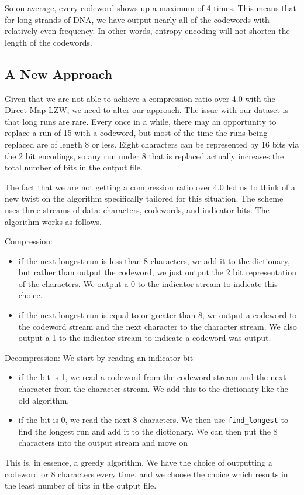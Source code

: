 \documentclass[12pt,twoside]{reedthesis}
\providecommand{\tightlist}{%
  \setlength{\itemsep}{0pt}\setlength{\parskip}{0pt}}
\begin{document}
So on average, every codeword shows up a maximum of 4 times. This means that for long strands of DNA, we have output nearly all of the codewords with relatively even frequency. In other words, entropy encoding will not shorten the length of the codewords.

\hypertarget{a-new-approach}{%
\subsection{A New Approach}\label{a-new-approach}}

Given that we are not able to achieve a compression ratio over 4.0 with the Direct Map LZW, we need to alter our approach. The issue with our dataset is that long runs are rare. Every once in a while, there may an opportunity to replace a run of 15 with a codeword, but most of the time the runs being replaced are of length 8 or less. Eight characters can be represented by 16 bits via the 2 bit encodings, so any run under 8 that is replaced actually increases the total number of bits in the output file.

The fact that we are not getting a compression ratio over 4.0 led us to think of a new twist on the algorithm specifically tailored for this situation. The scheme uses three streams of data: characters, codewords, and indicator bits. The algorithm works as follows.

Compression:
\begin{itemize}
\tightlist
\item
  if the next longest run is less than 8 characters, we add it to the dictionary, but rather than output the codeword, we just output the 2 bit representation of the characters. We output a 0 to the indicator stream to indicate this choice.
\item
  if the next longest run is equal to or greater than 8, we output a codeword to the codeword stream and the next character to the character stream. We also output a 1 to the indicator stream to indicate a codeword was output.
\end{itemize}
Decompression: We start by reading an indicator bit
\begin{itemize}
\tightlist
\item
  if the bit is 1, we read a codeword from the codeword stream and the next character from the character stream. We add this to the dictionary like the old algorithm.
\item
  if the bit is 0, we read the next 8 characters. We then use \texttt{find\_longest} to find the longest run and add it to the dictionary. We can then put the 8 characters into the output stream and move on
\end{itemize}
This is, in essence, a greedy algorithm. We have the choice of outputting a codeword or 8 characters every time, and we choose the choice which results in the least number of bits in the output file.
\end{document}
